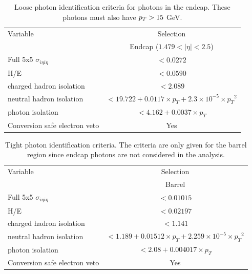\begin{table}[htb!]
    \centering
    \small
    \def\arraystretch{1.2}
    \begin{tabular}{l c}
    \hline
    Variable                                   &  Selection       \\
                                               &  Endcap ($1.479<|\eta|<2.5$)  \\
    \hline
    \hline
    Full 5x5 $\sigma_{i\eta i\eta}$            & $< 0.0272 $    \\
    H/E                                        & $< 0.0590 $    \\
    charged hadron isolation                   & $< 2.089 $     \\
    neutral hadron isolation                   & $< 19.722 + 0.0117\times p_T+2.3\times 10^{-5} \times {p_T}^2$ \\
    photon isolation                           & $< 4.162 + 0.0037\times p_T$  \\
    Conversion safe electron veto              & Yes           \\
    \hline
    \end{tabular}
    \caption{Loose photon identification criteria for photons in the endcap. These photons must also have $p_T > 15$ GeV.}
    \label{tab:PhotonIDLooseEndcap}
\end{table}

\begin{table}[htb!]
    \centering
    \small
    \def\arraystretch{1.2}
    \begin{tabular}{l c}
    \hline
    Variable                                   &  Selection       \\
                                               &  Barrel  \\
    \hline
    \hline
    Full 5x5 $\sigma_{i\eta i\eta}$            & $<  0.01015  $ \\
    H/E                                        & $<  0.02197  $   \\
    charged hadron isolation                   & $< 1.141  $     \\
    neutral hadron isolation                   & $< 1.189  + 0.01512\times p_T+2.259\times 10^{-5} \times {p_T}^2$ \\
    photon isolation                           & $< 2.08 + 0.004017\times p_T$  \\
    Conversion safe electron veto              & Yes           \\
    \hline
    \end{tabular}
    \caption{Tight photon identification criteria. The criteria are only given for the barrel region since endcap photons are not 
    considered in the analysis.}
    \label{tab:PhotonIDTight}
\end{table}

